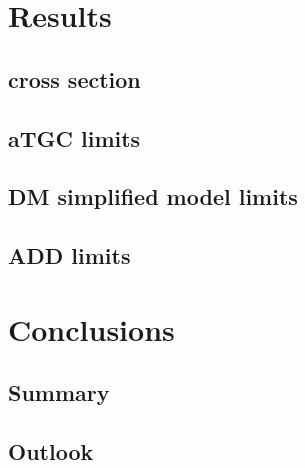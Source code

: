 \documentclass[oneside, letterpaper, 12pt, oldfontcommands]{memoir}
\begin{document}
\chapter{Results} \label{chap:results}
\section{\texorpdfstring{\zinvg}{Z(νν)γ} cross section} \label{sec:results_znng_xsec}
\section{aTGC limits} \label{sec:results_aTGC}
\section{DM simplified model limits} \label{sec:results_DM}
\section{ADD limits} \label{sec:results_ADD}

\chapter{Conclusions} \label{chap:conclusions}
\section{Summary} \label{sec:conclusions_summary}
\section{Outlook} \label{sec:conclusions_outlook}



\end{document}
